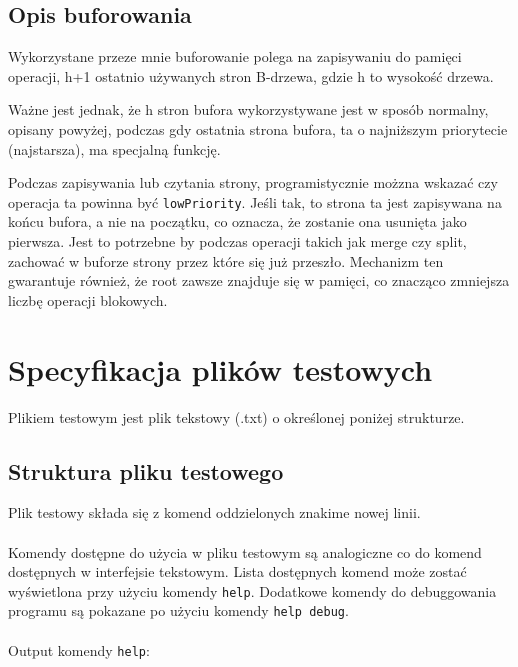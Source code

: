 \documentclass[12pt]{article}
\begin{document}
\subsection{Opis buforowania}

Wykorzystane przeze mnie buforowanie polega na zapisywaniu do pamięci operacji, 
h+1 ostatnio używanych stron B-drzewa, gdzie h to wysokość drzewa.

Ważne jest jednak, że h stron bufora wykorzystywane jest w sposób normalny, opisany powyżej,
podczas gdy ostatnia strona bufora, ta o najniższym priorytecie (najstarsza),
ma specjalną funkcję.

Podczas zapisywania lub czytania strony, programistycznie możzna wskazać czy
operacja ta powinna być \texttt{lowPriority}. Jeśli tak, to strona ta jest zapisywana
na końcu bufora, a nie na początku, co oznacza, że zostanie ona usunięta jako pierwsza.
Jest to potrzebne by podczas operacji takich jak merge czy split, zachować w buforze
strony przez które się już przeszło. Mechanizm ten gwarantuje również, że root zawsze
znajduje się w pamięci, co znacząco zmniejsza liczbę operacji blokowych.
 
\section{Specyfikacja plików testowych}
Plikiem testowym jest plik tekstowy (.txt) o określonej poniżej strukturze.
\subsection{Struktura pliku testowego}
Plik testowy składa się z komend oddzielonych znakime nowej linii.
\\\\
Komendy dostępne do użycia w pliku testowym są analogiczne co do komend dostępnych w interfejsie tekstowym.
Lista dostępnych komend może zostać wyświetlona przy użyciu komendy \verb!help!. Dodatkowe komendy do debuggowania
programu są pokazane po użyciu komendy \verb!help debug!.
\\\\
Output komendy \verb!help!:
\end{document}
